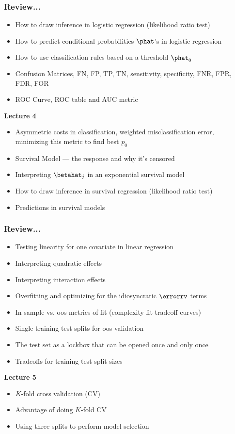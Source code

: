 \documentclass[handout]{beamer}
\begin{document}
\begin{frame}\frametitle{Review...}
\begin{itemize}
\item How to draw inference in logistic regression (likelihood ratio test)
\item How to predict conditional probabilities $\phat$'s in logistic regression
\item How to use classification rules based on a threshold $\phat_0$
\item Confusion Matrices, FN, FP, TP, TN, sensitivity, specificity, FNR, FPR, FDR, FOR
\item ROC Curve, ROC table and AUC metric
\end{itemize}
	
\textbf{Lecture 4}

\begin{itemize}
\item Asymmetric costs in classification, weighted misclassification error, minimizing this metric to find best $p_0$
\item Survival Model --- the response and why it's censored
\item Interpreting $\betahat_j$ in an exponential survival model
\item How to draw inference in survival regression (likelihood ratio test)
\item Predictions in survival models

\end{itemize}
\end{frame}

\begin{frame}\frametitle{Review...}

\begin{itemize}
\item Testing linearity for one covariate in linear regression
\item Interpreting quadratic effects
\item Interpreting interaction effects
\item Overfitting and optimizing for the idiosyncratic $\errorrv$ terms
\item In-sample vs. oos metrics of fit (complexity-fit tradeoff curves)
\item Single training-test splits for oos validation
\item The test set as a lockbox that can be opened once and only once
\item Tradeoffs for training-test split sizes
\end{itemize}
	
\textbf{Lecture 5}

\begin{itemize}
\item $K$-fold cross validation (CV)
\item Advantage of doing $K$-fold CV
\item Using three splits to perform model selection
\end{itemize}
	
\end{frame}
\end{document}
